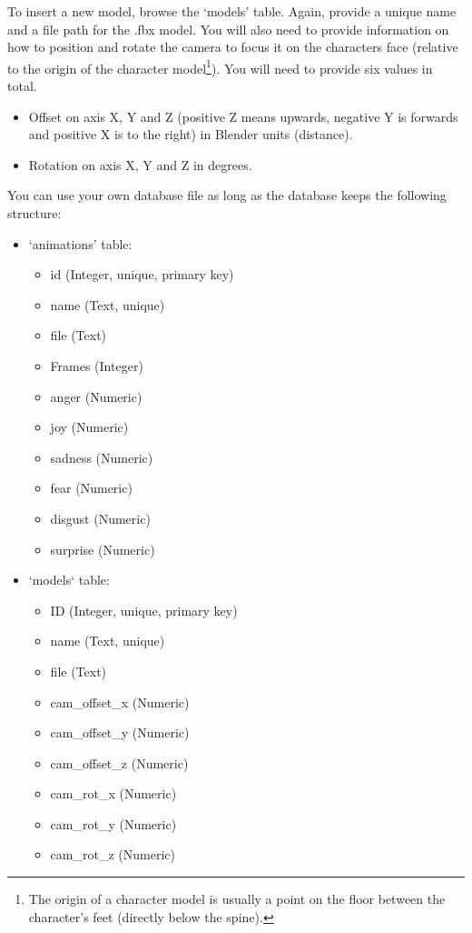 To insert a new model, browse the `models' table. Again, provide a unique name and a file path for the .fbx model. You will also need to provide information on how to position and rotate the camera to focus it on the characters face (relative to the origin of the character model\footnote{The origin of a character model is usually a point on the floor between the character's feet (directly below the spine).}). You will need to provide six values in total.
\begin{itemize}
	\item Offset on axis X, Y and Z (positive Z means upwards, negative Y is forwards and positive X is to the right) in Blender units (distance).
	\item Rotation on axis X, Y and Z in degrees.
\end{itemize}

\noindent You can use your own database file as long as the database keeps the following structure:
\begin{itemize}
	\item `animations' table:
	
	\begin{itemize}
		\item id (Integer, unique, primary key)
		\item name (Text, unique)
		\item file (Text)
		\item Frames (Integer)
		\item anger (Numeric)
		\item joy (Numeric)
		\item sadness (Numeric)
		\item fear (Numeric)
		\item disgust (Numeric)
		\item surprise (Numeric)
	\end{itemize}

	\item `models` table:
	
	\begin{itemize}
		\item ID (Integer, unique, primary key)
		\item name (Text, unique)
		\item file (Text)
		\item cam\_offset\_x (Numeric)
		\item cam\_offset\_y (Numeric)
		\item cam\_offset\_z (Numeric)
		\item cam\_rot\_x (Numeric)
		\item cam\_rot\_y (Numeric)
		\item cam\_rot\_z (Numeric)
	\end{itemize}
\end{itemize}

